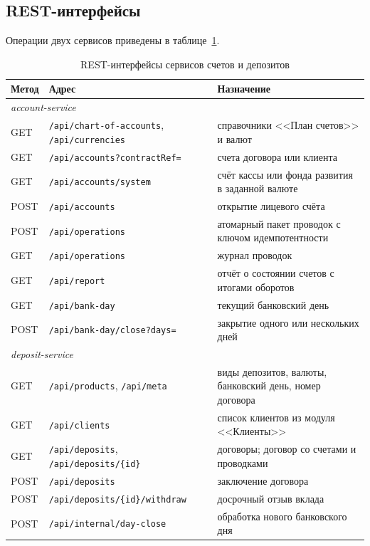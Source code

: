 \documentclass[14pt,a4paper]{extarticle}
\begin{document}
\subsection{REST-интерфейсы}

Операции двух сервисов приведены в таблице~\ref{tab:rest}.

\begin{table}[H]
\caption{REST-интерфейсы сервисов счетов и депозитов}
\label{tab:rest}
\centering
\footnotesize
\begin{tabularx}{\textwidth}{llX}
\toprule
Метод & Адрес & Назначение \\
\midrule
\multicolumn{3}{l}{\textit{account-service}} \\
GET & \texttt{/api/chart-of-accounts}, \texttt{/api/currencies} & справочники <<План счетов>> и валют \\
GET & \texttt{/api/accounts?contractRef=} & счета договора или клиента \\
GET & \texttt{/api/accounts/system} & счёт кассы или фонда развития в заданной валюте \\
POST & \texttt{/api/accounts} & открытие лицевого счёта \\
POST & \texttt{/api/operations} & атомарный пакет проводок с ключом идемпотентности \\
GET & \texttt{/api/operations} & журнал проводок \\
GET & \texttt{/api/report} & отчёт о состоянии счетов с итогами оборотов \\
GET & \texttt{/api/bank-day} & текущий банковский день \\
POST & \texttt{/api/bank-day/close?days=} & закрытие одного или нескольких дней \\
\midrule
\multicolumn{3}{l}{\textit{deposit-service}} \\
GET & \texttt{/api/products}, \texttt{/api/meta} & виды депозитов, валюты, банковский день, номер договора \\
GET & \texttt{/api/clients} & список клиентов из модуля <<Клиенты>> \\
GET & \texttt{/api/deposits}, \texttt{/api/deposits/\{id\}} & договоры; договор со счетами и проводками \\
POST & \texttt{/api/deposits} & заключение договора \\
POST & \texttt{/api/deposits/\{id\}/withdraw} & досрочный отзыв вклада \\
POST & \texttt{/api/internal/day-close} & обработка нового банковского дня \\
\bottomrule
\end{tabularx}
\end{table}
\end{document}
